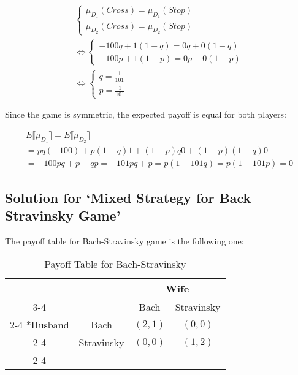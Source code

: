 \documentclass{article}
\begin{document}
\begin{align*}
    \begin{cases}
        \mu_{D_1}(\textit{Cross})  = \mu_{D_1}(\textit{Stop}) \\
        \mu_{D_2}(\textit{Cross})  = \mu_{D_2}(\textit{Stop})
    \end{cases} \\
    \iff
    \begin{cases}
        -100q + 1(1 - q) = 0 q + 0(1 - q) \\
        -100p + 1(1 - p) = 0 p + 0(1 - p)
    \end{cases} \\
    \iff
    \begin{cases}
        q = \frac{1}{101} \\
        p = \frac{1}{101}
    \end{cases}
\end{align*}

\noindent Since the game is symmetric, the expected payoff is equal for both players:

\begin{align*}
    E \llbracket \mu_{D_1} \rrbracket = E \llbracket \mu_{D_2} \rrbracket  \\
    = pq(-100) + p(1- q)1 + (1- p)q0 + (1 - p)(1 - q)0 \\
    = -100pq + p - qp = -101pq + p = p (1 - 101q) = p(1 - 101p) = 0
\end{align*}

\subsection{Solution for `Mixed Strategy for Back Stravinsky Game'}

The payoff table for Bach-Stravinsky game is the following one:

\begin{table}[h!]
    \centering
    \setlength{\extrarowheight}{2pt}
    \begin{tabular}{*{4}{c|}}
      \multicolumn{2}{c}{} & \multicolumn{2}{c}{Wife}\\\cline{3-4}
      \multicolumn{1}{c}{} &  & Bach  & Stravinsky \\\cline{2-4}
      \multirow{2}*{Husband}  & Bach & $(2,1)$ & $(0, 0)$ \\\cline{2-4}
      & Stravinsky & $(0, 0)$ & $(1, 2)$ \\\cline{2-4}
    \end{tabular}
    \caption{Payoff Table for Bach-Stravinsky}
\end{table}
\end{document}

